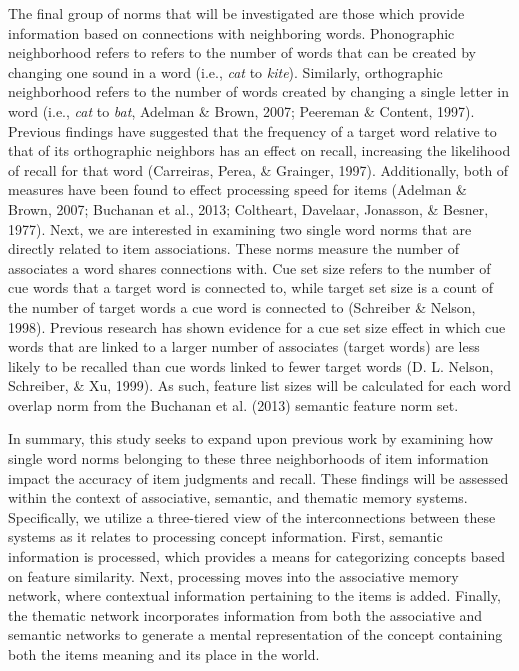 \documentclass[english,man]{apa6}
\theoremstyle{definition}
\theoremstyle{definition}
\theoremstyle{definition}
\theoremstyle{remark}
\begin{document}
The final group of norms that will be investigated are those which
provide information based on connections with neighboring words.
Phonographic neighborhood refers to refers to the number of words that
can be created by changing one sound in a word (i.e., \emph{cat} to
\emph{kite}). Similarly, orthographic neighborhood refers to the number
of words created by changing a single letter in word (i.e., \emph{cat}
to \emph{bat}, Adelman \& Brown, 2007; Peereman \& Content, 1997).
Previous findings have suggested that the frequency of a target word
relative to that of its orthographic neighbors has an effect on recall,
increasing the likelihood of recall for that word (Carreiras, Perea, \&
Grainger, 1997). Additionally, both of measures have been found to
effect processing speed for items (Adelman \& Brown, 2007; Buchanan et
al., 2013; Coltheart, Davelaar, Jonasson, \& Besner, 1977). Next, we are
interested in examining two single word norms that are directly related
to item associations. These norms measure the number of associates a
word shares connections with. Cue set size refers to the number of cue
words that a target word is connected to, while target set size is a
count of the number of target words a cue word is connected to
(Schreiber \& Nelson, 1998). Previous research has shown evidence for a
cue set size effect in which cue words that are linked to a larger
number of associates (target words) are less likely to be recalled than
cue words linked to fewer target words (D. L. Nelson, Schreiber, \& Xu,
1999). As such, feature list sizes will be calculated for each word
overlap norm from the Buchanan et al. (2013) semantic feature norm set.

In summary, this study seeks to expand upon previous work by examining
how single word norms belonging to these three neighborhoods of item
information impact the accuracy of item judgments and recall. These
findings will be assessed within the context of associative, semantic,
and thematic memory systems. Specifically, we utilize a three-tiered
view of the interconnections between these systems as it relates to
processing concept information. First, semantic information is
processed, which provides a means for categorizing concepts based on
feature similarity. Next, processing moves into the associative memory
network, where contextual information pertaining to the items is added.
Finally, the thematic network incorporates information from both the
associative and semantic networks to generate a mental representation of
the concept containing both the items meaning and its place in the
world.
\end{document}
